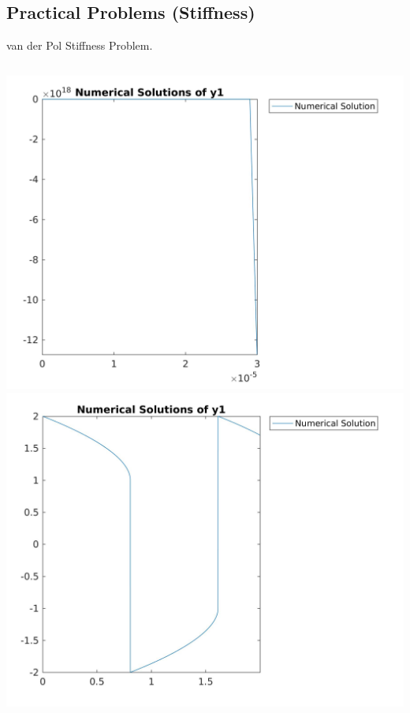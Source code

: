 \documentclass[9pt]{beamer}
\numberwithin{equation}{section}
\begin{document}
\subsection{Practical Problems (Stiffness)}
\begin{frame}{van der Pol Stiffness Problem.}
\begin{columns}[t]
\centering
\includegraphics[scale=0.151]{fts_vdp_y1_1e-6}
\centering
\includegraphics[scale=0.151]{fts_vdp_y1_1e-7}
\end{columns}

\end{frame}
\end{document}
